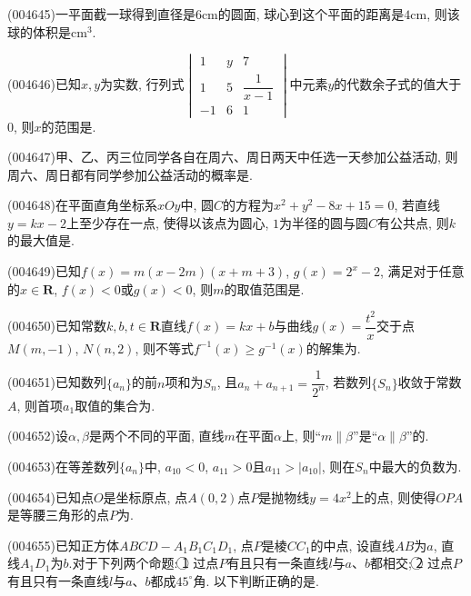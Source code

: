 \item (004645)一平面截一球得到直径是$6\text{cm}$的圆面, 球心到这个平面的距离是$4\text{cm}$, 则该球的体积是$\text{cm}^3$.
\item (004646)已知$x,y$为实数, 行列式$\begin{vmatrix}
1 & y & 7  \\1 & 5 & \dfrac 1{x-1}  \\-1 & 6 & 1  \end{vmatrix}$中元素$y$的代数余子式的值大于$0$, 则$x$的范围是.
\item (004647)甲、乙、丙三位同学各自在周六、周日两天中任选一天参加公益活动, 则周六、周日都有同学参加公益活动的概率是.
\item (004648)在平面直角坐标系$xOy$中, 圆$C$的方程为$x^2+y^2-8x+15=0$, 若直线$y=kx-2$上至少存在一点, 使得以该点为圆心, $1$为半径的圆与圆$C$有公共点, 则$k$的最大值是.
\item (004649)已知$f(x)=m(x-2m)(x+m+3)$, $g(x)=2^x-2$, 满足对于任意的$x\in \mathbf{R}$, $f(x)<0$或$g(x)<0$, 则$m$的取值范围是.
\item (004650)已知常数$k,b,t\in \mathbf{R}$直线$f(x)=kx+b$与曲线$g(x)=\dfrac{t^2}x$交于点$M(m,-1)$, $N(n,2)$, 则不等式$f^{-1}(x)\ge g^{-1}(x)$的解集为.
\item (004651)已知数列$\{a_n\}$的前$n$项和为$S_n$, 且$a_n+a_{n+1}=\dfrac 1{2^n}$, 若数列$\{S_n\}$收敛于常数$A$, 则首项$a_1$取值的集合为.
\item (004652)设$\alpha,\beta$是两个不同的平面, 直线$m$在平面$\alpha$上, 则``$m\parallel\beta$''是``$\alpha\parallel\beta$''的.
\item (004653)在等差数列$\{a_n\}$中, $a_{10}<0$, $a_{11}>0$且$a_{11}>|a_{10}|$, 则在$S_n$中最大的负数为.
\item (004654)已知点$O$是坐标原点, 点$A(0,2)$点$P$是抛物线$y=4x^2$上的点, 则使得$OPA$是等腰三角形的点$P$为.
\item (004655)已知正方体$ABCD-A_1B_1C_1D_1$, 点$P$是棱$CC_1$的中点, 设直线$AB$为$a$, 直线$A_1D_1$为$b$.对于下列两个命题: \textcircled{1} 过点$P$有且只有一条直线$l$与$a$、$b$都相交; \textcircled{2} 过点$P$有且只有一条直线$l$与$a$、$b$都成$45^\circ$角. 以下判断正确的是.
\begin{center}
\end{center}
